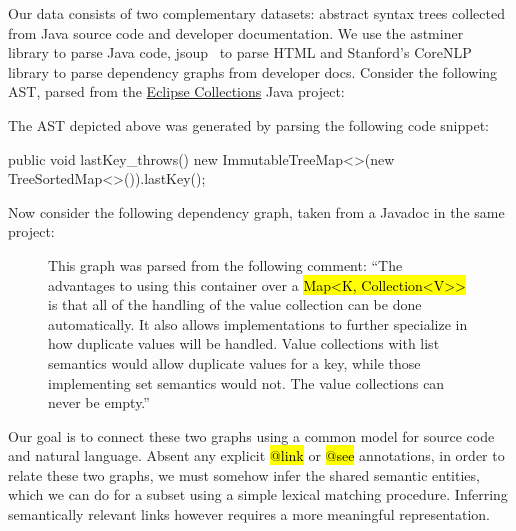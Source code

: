 \documentclass{article}
\newcommand{\tinline}[1]{%
    \begingroup%
    \sethlcolor{slightgray}%
    \hl{\ttfamily\footnotesize #1}%
    \endgroup
}
\begin{document}
Our data consists of two complementary datasets: abstract syntax trees collected from Java source code and developer documentation. We use the astminer~\citep{kovalenko2019pathminer} library to parse Java code, jsoup~\citep{hedley2009jsoup} to parse HTML and Stanford's CoreNLP~\citep{manning2014stanford} library to parse dependency graphs from developer docs. Consider the following AST, parsed from the \href{https://www.eclipse.org/collections/}{Eclipse Collections} Java project:

\vspace{20pt}

\begin{figure}[H]
    \centering
    
    \label{fig:ast}
\end{figure}

\vspace{-30pt}The AST depicted above was generated by parsing the following code snippet:

\begin{javalisting}
public void lastKey_throws() {
    new ImmutableTreeMap<>(new TreeSortedMap<>()).lastKey();
}
\end{javalisting}

Now consider the following dependency graph, taken from a Javadoc in the same project:

\begin{figure}[H]
    \centering
    
    \caption{This graph was parsed from the following comment: ``The advantages to using this container over a \footnotesize\tinline{Map<K, Collection<V>{}>} is that all of the handling of the value collection can be done automatically. It also allows implementations to further specialize in how duplicate values will be handled. Value collections with list semantics would allow duplicate values for a key, while those implementing set semantics would not. The value collections can never be empty.''}
    \label{fig:eng}
\end{figure}

Our goal is to connect these two graphs using a common model for source code and natural language. Absent any explicit \tinline{@link} or \tinline{@see} annotations, in order to relate these two graphs, we must somehow infer the shared semantic entities, which we can do for a subset using a simple lexical matching procedure. Inferring semantically relevant links however requires a more meaningful representation.
\end{document}
